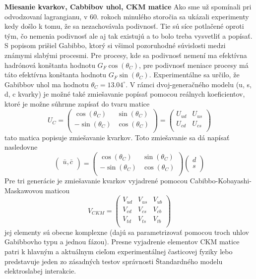 \documentclass[../../main.tex]{subfiles}
\begin{document}
\textbf{Miesanie kvarkov, Cabbibov uhol, CKM matice}
Ako sme už spomínali pri odvodzovaní lagrangianu, v 60. rokoch minulého storočia sa ukázali experimenty kedy došlo k tomu, že sa nezachovávala podivnosť. Tie sú síce potlačené oproti tým, čo nemenia podivnosť ale aj tak existujú a to bolo treba vysvetliť a popísať. S popisom prišiel Gabibbo, ktorý si všimol pozoruhodné súvislosti medzi známymi slabými procesmi. Pre procesy, kde sa podivnosť nemení ma efektívna hadrónová konštanta hodnotu $G_F\cos(\theta_C)$, pre podivnosť meniace procesy má táto efektívna konštanta hodnotu $G_F\sin(\theta_C)$. Experimentálne sa určilo, že Gabibbov uhol ma hodnotu $\theta_C=13.04^{\circ}$. V rámci dvoj-generačného modelu (u, s, d, c kvarky) je možné také zmiešavanie popísať pomocou reálnych koeficientov, ktoré je možne súhrnne zapísať do tvaru matice
\[ U_C=
\begin{pmatrix}
    \cos(\theta_C) & \sin(\theta_C) \\
    -\sin(\theta_C) & \cos(\theta_C) \\
\end{pmatrix}=
\begin{pmatrix}
    U_{ud} & U_{us} \\
    U_{cd} & U_{cs} \\
\end{pmatrix}
\]
tato matica popisuje zmiešavanie kvarkov. Toto zmiešavanie sa dá napísať nasledovne 
\[
\begin{pmatrix}
    \bar{u},\bar{c} \\
\end{pmatrix}=
\begin{pmatrix}
    \cos(\theta_C) & \sin(\theta_C) \\
    -\sin(\theta_C) & \cos(\theta_C) \\
\end{pmatrix}
\begin{pmatrix}
    d \\
    s \\
\end{pmatrix}
\]
Pre tri generácie je zmiešavanie kvarkov vyjadrené pomocou Cabibbo-Kobayashi-Maskawovou maticou
\[ V_{CKM}=
\begin{pmatrix}
    V_{ud} & V_{us} & V_{ub} \\
    V_{cd} & V_{cs} & V_{cb} \\
    V_{td} & V_{ts} & V_{tb} \\
\end{pmatrix}
\]
jej elementy sú obecne komplexne (dajú sa parametrizovať pomocou troch uhlov Gabibbovho typu a jednou fázou). Presne vyjadrenie elementov CKM matice patri k hlavným a aktuálnym cieľom experimentálnej časticovej fyziky lebo predstavuje jeden zo zásadných testov správnosti Štandardného modelu elektroslabej interakcie.
\end{document}
